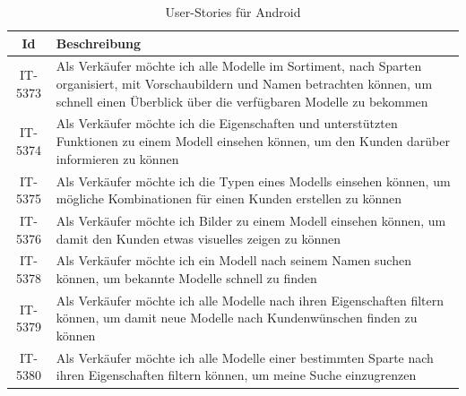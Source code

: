 \clearpage


\begin{table}[hbt]
    \centering
    \begin{minipage}[t]{1\textwidth} %
        \caption{User-Stories für Android} %
        \begin{tabularx}{\columnwidth}{ |c|X| }
            \hline
            \textbf{Id} & \textbf{Beschreibung}                                                                                                                                                                              \\
            \hline
            IT-5373     & Als Verkäufer möchte ich alle Modelle im Sortiment, nach Sparten organisiert, mit Vorschaubildern und Namen betrachten können, um schnell einen Überblick über die verfügbaren Modelle zu bekommen \\
            \hline
            IT-5374     & Als Verkäufer möchte ich die Eigenschaften und unterstützten Funktionen zu einem Modell einsehen können, um den Kunden darüber informieren zu können
            \\
            \hline
            IT-5375     & Als Verkäufer möchte ich die Typen eines Modells einsehen können, um mögliche Kombinationen für einen Kunden erstellen zu können                                                                   \\
            \hline
            IT-5376     & Als Verkäufer möchte ich Bilder zu einem Modell einsehen können, um damit den Kunden etwas visuelles zeigen zu können                                                                              \\
            \hline
            IT-5378     & Als Verkäufer möchte ich ein Modell nach seinem Namen suchen können, um bekannte Modelle schnell zu finden                                                                                         \\
            \hline
            IT-5379     & Als Verkäufer möchte ich alle Modelle nach ihren Eigenschaften filtern können, um damit neue Modelle nach Kundenwünschen finden zu können                                                          \\
            \hline
            IT-5380     & Als Verkäufer möchte ich alle Modelle einer bestimmten Sparte nach ihren Eigenschaften filtern können, um meine Suche einzugrenzen                                                                 \\

\end{tabularx}
\end{minipage}
\end{table}
